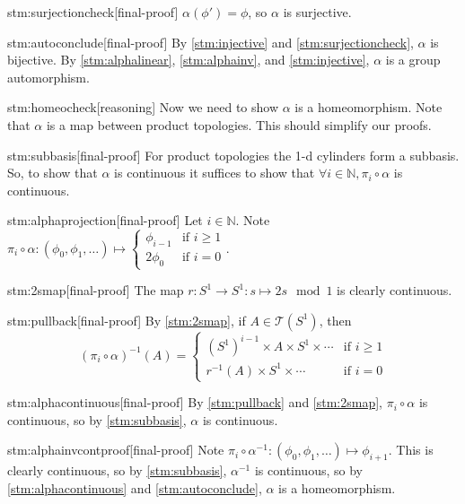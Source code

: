 \documentclass{article}
\begin{document}
\begin{stm}{stm:surjectioncheck}[final-proof]
$\alpha(\phi') = \phi$, so $\alpha$ is surjective.
\end{stm}

\begin{stm}{stm:autoconclude}[final-proof]
By \ref{stm:injective} and \ref{stm:surjectioncheck}, $\alpha$ is bijective. By \ref{stm:alphalinear}, \ref{stm:alphainv}, and \ref{stm:injective}, $\alpha$ is a group automorphism.
\end{stm} 

\begin{stm}{stm:homeocheck}[reasoning]
Now we need to show $\alpha$ is a homeomorphism. Note that $\alpha$ is a map between product topologies. This should simplify our proofs.
\end{stm}

\begin{stm}{stm:subbasis}[final-proof]
For product topologies the 1-d cylinders form a subbasis. So, to show that $\alpha$ is continuous it suffices to show that $\forall i \in \mathbb{N}, \pi_i \circ \alpha$ is continuous.
\end{stm}

\begin{stm}{stm:alphaprojection}[final-proof]
Let $i \in \mathbb{N}$. Note $\pi_i \circ \alpha : (\phi_0, \phi_1, \dots) \mapsto \begin{cases} \phi_{i-1} & \text{if } i \ge 1 \\ 2\phi_0 & \text{if } i = 0 \end{cases}$.
\end{stm}

\begin{stm}{stm:2smap}[final-proof]
The map $r : S^1 \to S^1 : s \mapsto 2s \mod 1$ is clearly continuous.
\end{stm}

\begin{stm}{stm:pullback}[final-proof]
By \ref{stm:2smap}, if $A \in \mathcal{T}(S^1)$, then 
\[
(\pi_i \circ \alpha)^{-1}(A) = 
\begin{cases}
(S^1)^{i-1} \times A \times S^1 \times \cdots & \text{if } i \ge 1 \\
r^{-1}(A) \times S^1 \times \cdots & \text{if } i = 0
\end{cases}
\]
\end{stm}

\begin{stm}{stm:alphacontinuous}[final-proof]
By \ref{stm:pullback} and \ref{stm:2smap}, $\pi_i \circ \alpha$ is continuous, so by \ref{stm:subbasis}, $\alpha$ is continuous.
\end{stm}

\begin{stm}{stm:alphainvcontproof}[final-proof]
Note $\pi_i \circ \alpha^{-1} : (\phi_0, \phi_1, \dots) \mapsto \phi_{i+1}$. This is clearly continuous, so by \ref{stm:subbasis}, $\alpha^{-1}$ is continuous, so by \ref{stm:alphacontinuous} and \ref{stm:autoconclude}, $\alpha$ is a homeomorphism.
\end{stm}
\end{document}
